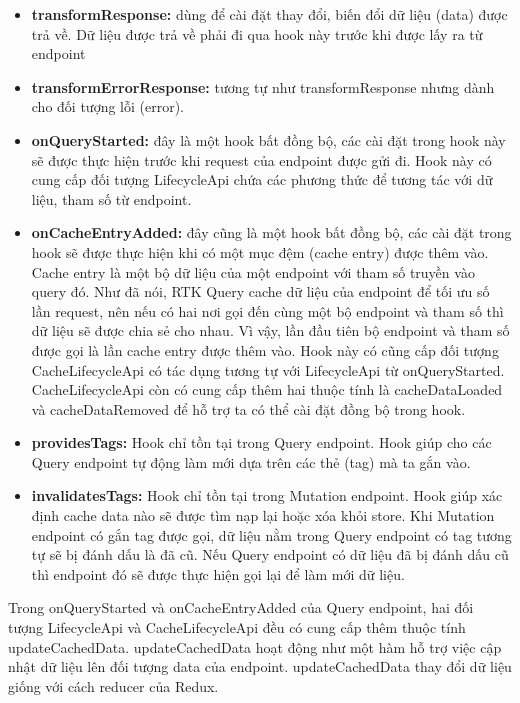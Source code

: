 \begin{itemize}
      \item \textbf{transformResponse:} dùng để cài đặt thay đổi, biến đổi dữ liệu (data) được trả về.
            Dữ liệu được trả về phải đi qua hook này trước khi được lấy ra từ endpoint
      \item \textbf{transformErrorResponse:} tương tự như transformResponse nhưng dành cho đối tượng lỗi (error).
      \item \textbf{onQueryStarted:} đây là một hook bất đồng bộ, các cài đặt trong hook này sẽ được thực hiện trước khi request của endpoint được gửi đi. Hook này có cung cấp đối tượng LifecycleApi chứa các phương thức để tương tác với dữ liệu, tham số từ endpoint.
      \item \textbf{onCacheEntryAdded:} đây cũng là một hook bất đồng bộ, các cài đặt trong hook sẽ được thực hiện khi có một mục đệm (cache entry) được thêm vào.
            Cache entry là một bộ dữ liệu của một endpoint với tham số truyền vào query đó.
            Như đã nói, RTK Query cache dữ liệu của endpoint để tối ưu số lần request, nên nếu có hai nơi gọi đến cùng một bộ endpoint và tham số thì dữ liệu sẽ được chia sẻ cho nhau.
            Vì vậy, lần đầu tiên bộ endpoint và tham số được gọi là lần cache entry được thêm vào.
            Hook này có cũng cấp đối tượng CacheLifecycleApi có tác dụng tương tự với LifecycleApi từ onQueryStarted.
            CacheLifecycleApi còn có cung cấp thêm hai thuộc tính là cacheDataLoaded và cacheDataRemoved để hỗ trợ ta có thể cài đặt đồng bộ trong hook.
      \item \textbf{providesTags:} Hook chỉ tồn tại trong Query endpoint.
            Hook giúp cho các Query endpoint tự động làm mới dựa trên các thẻ (tag) mà ta gắn vào.
      \item \textbf{invalidatesTags:} Hook chỉ tồn tại trong Mutation endpoint.
            Hook giúp xác định cache data nào sẽ được tìm nạp lại hoặc xóa khỏi store.
            Khi Mutation endpoint có gắn tag được gọi, dữ liệu nằm trong Query endpoint có tag tương tự sẽ bị đánh dấu là đã cũ.
            Nếu Query endpoint có dữ liệu đã bị đánh dấu cũ thì endpoint đó sẽ được thực hiện gọi lại để làm mới dữ liệu.
\end{itemize}

Trong onQueryStarted và onCacheEntryAdded của Query endpoint, hai đối tượng LifecycleApi và CacheLifecycleApi đều có cung cấp thêm thuộc tính updateCachedData.
updateCachedData hoạt động như một hàm hỗ trợ việc cập nhật dữ liệu lên đối tượng data của endpoint.
updateCachedData thay đổi dữ liệu giống với cách reducer của Redux.
\par

